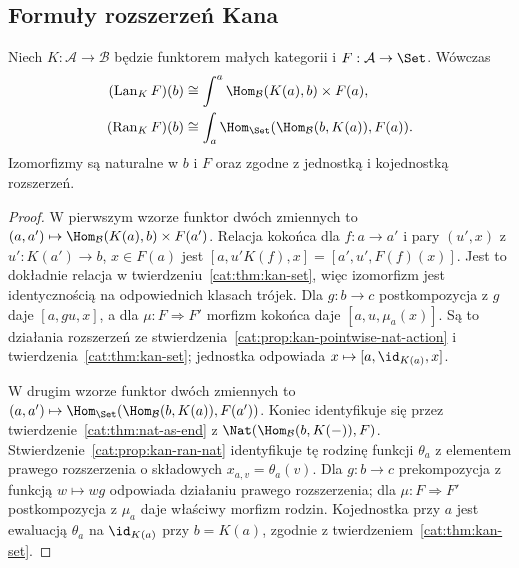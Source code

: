 \subsection{Formuły rozszerzeń Kana}
\begin{twierdzenie}\label{cat:thm:kan-end-coend}
Niech $K:\mathcal A\to\mathcal B$ będzie funktorem małych kategorii i $F:\mathcal A\to\Set$. Wówczas
\begin{align}
 (\operatorname{Lan}_K F)(b)
 &\cong\int^a\Hom_{\mathcal B}(K(a),b)\times F(a),\label{cat:eq:lan-coend}\\
 (\operatorname{Ran}_K F)(b)
 &\cong\int_a\Hom_{\Set}(\Hom_{\mathcal B}(b,K(a)),F(a)).\label{cat:eq:ran-end}
\end{align}
Izomorfizmy są naturalne w $b$ i $F$ oraz zgodne z jednostką i kojednostką rozszerzeń.
\end{twierdzenie}
\begin{proof}
W pierwszym wzorze funktor dwóch zmiennych to $(a,a')\mapsto\Hom_{\mathcal B}(K(a),b)\times F(a')$. Relacja kokońca dla $f:a\to a'$ i pary $(u',x)$ z $u':K(a')\to b$, $x\in F(a)$ jest $[a,u'K(f),x]=[a',u',F(f)(x)]$. Jest to dokładnie relacja w twierdzeniu~\ref{cat:thm:kan-set}, więc izomorfizm jest identycznością na odpowiednich klasach trójek. Dla $g:b\to c$ postkompozycja z $g$ daje $[a,gu,x]$, a dla $\mu:F\Rightarrow F'$ morfizm kokońca daje $[a,u,\mu_a(x)]$. Są to działania rozszerzeń ze stwierdzenia~\ref{cat:prop:kan-pointwise-nat-action} i twierdzenia~\ref{cat:thm:kan-set}; jednostka odpowiada $x\mapsto[a,\id_{K(a)},x]$.

W drugim wzorze funktor dwóch zmiennych to $(a,a')\mapsto\Hom_{\Set}(\Hom_{\mathcal B}(b,K(a)),F(a'))$. Koniec identyfikuje się przez twierdzenie~\ref{cat:thm:nat-as-end} z $\Nat(\Hom_{\mathcal B}(b,K(-)),F)$. Stwierdzenie~\ref{cat:prop:kan-ran-nat} identyfikuje tę rodzinę funkcji $\theta_a$ z elementem prawego rozszerzenia o składowych $x_{a,v}=\theta_a(v)$. Dla $g:b\to c$ prekompozycja z funkcją $w\mapsto wg$ odpowiada działaniu prawego rozszerzenia; dla $\mu:F\Rightarrow F'$ postkompozycja z $\mu_a$ daje właściwy morfizm rodzin. Kojednostka przy $a$ jest ewaluacją $\theta_a$ na $\id_{K(a)}$ przy $b=K(a)$, zgodnie z twierdzeniem~\ref{cat:thm:kan-set}.
\end{proof}
